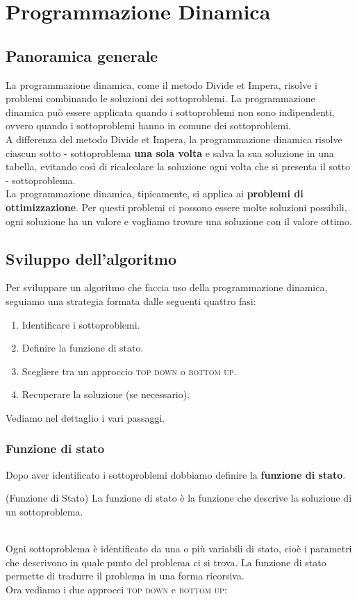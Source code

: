 \chapter{Programmazione Dinamica}
\section{Panoramica generale}
La programmazione dinamica, come il metodo Divide et Impera, risolve i problemi combinando le soluzioni dei sottoproblemi. La programmazione dinamica può essere applicata quando i sottoproblemi non sono indipendenti, ovvero quando i sottoproblemi hanno in comune dei sottoproblemi.\smallskip\\
A differenza del metodo Divide et Impera, la programmazione dinamica risolve ciascun sotto - sottoproblema \textbf{una sola volta} e salva la sua soluzione in una tabella, evitando così di ricalcolare la soluzione ogni volta che si presenta il sotto - sottoproblema.\smallskip\\
La programmazione dinamica, tipicamente, si applica ai \textbf{problemi di ottimizzazione}. Per questi problemi ci possono essere molte soluzioni possibili, ogni soluzione ha un valore e vogliamo trovare una soluzione con il valore ottimo.

\section{Sviluppo dell'algoritmo}
Per sviluppare un algoritmo che faccia uso della programmazione dinamica, seguiamo una strategia formata dalle seguenti quattro fasi:
\begin{enumerate}
    \item Identificare i sottoproblemi.
    \item Definire la funzione di stato.
    \item Scegliere tra un approccio \textsc{top down} o \textsc{bottom up}.

    \item Recuperare la soluzione (se necessario).
\end{enumerate}
Vediamo nel dettaglio i vari passaggi.

\subsection{Funzione di stato}
Dopo aver identificato i sottoproblemi dobbiamo definire la \textbf{funzione di stato}.\smallskip\\
\colorbox{SALZO}{\parbox{\dimexpr\linewidth-2\fboxsep}{\begin{definition}
    (Funzione di Stato) La funzione di stato è la funzione che descrive la soluzione di un sottoproblema. 
\end{definition}}}\smallskip\\
Ogni sottoproblema è identificato da una o più variabili di stato, cioè i parametri che descrivono in quale punto del problema ci si trova. La funzione di stato permette di tradurre il problema in una forma ricorsiva.\medskip\\
Ora vediamo i due approcci \textsc{top down} e \textsc{bottom up}:\smallskip\\

